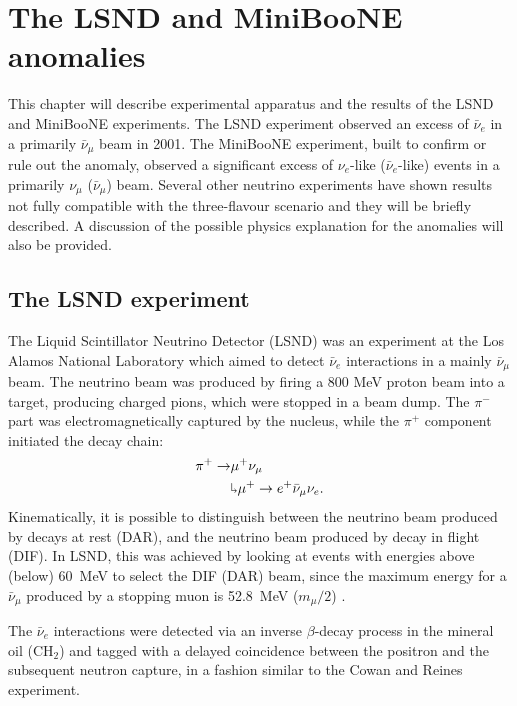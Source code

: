 \chapter{The LSND and MiniBooNE anomalies}

\minitoc

This chapter will describe experimental apparatus and the results of the LSND and MiniBooNE experiments. The LSND experiment observed an excess of $\bar{\nu}_{e}$ in a primarily $\bar{\nu}_{\mu}$ beam in 2001. The MiniBooNE experiment, built to confirm or rule out the anomaly, observed a significant excess of $\nu_{e}$-like ($\bar{\nu}_{e}$-like) events in a primarily $\nu_{\mu}$ ($\bar{\nu}_{\mu}$) beam. Several other neutrino experiments have shown results not fully compatible with the three-flavour scenario and they will be briefly described.  A discussion of the possible physics explanation for the anomalies will also be provided.

\section{The LSND experiment}
The Liquid Scintillator Neutrino Detector (LSND) was an experiment at the Los Alamos National Laboratory which aimed to detect $\bar{\nu}_e$ interactions in a mainly $\bar{\nu}_{\mu}$ beam. The neutrino beam was produced by firing a 800 MeV proton beam into a target, producing charged pions, which were stopped in a beam dump. The $\pi^-$ part was electromagnetically captured by the nucleus, while the $\pi^+$ component initiated the decay chain:
\begin{align}
    \pi^+ \rightarrow & \mu^+\nu_{\mu}\\
    & \rotatebox[origin=c]{180}{$\Lsh$}	 \mu^{+} \rightarrow e^+\bar{\nu}_{\mu}\nu_{e}.
\end{align}
Kinematically, it is possible to distinguish between the neutrino beam produced by decays at rest (DAR), and the neutrino beam produced by decay in flight (DIF). In LSND, this was achieved by looking at events with energies above (below) 60~MeV to select the DIF (DAR) beam, since the maximum energy for a $\bar{\nu}_{\mu}$ produced by a stopping muon is 52.8~MeV ($m_{\mu}/2$) .

The $\bar{\nu}_e$ interactions were detected via an inverse $\beta$-decay process in the mineral oil (CH$_2$) and tagged with a delayed coincidence between the positron and the subsequent neutron capture, in a fashion similar to the Cowan and Reines experiment. 


